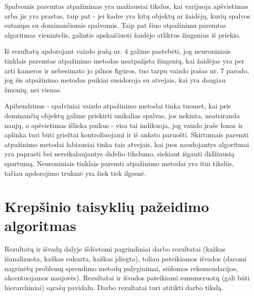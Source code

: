 \documentclass{VUMIFPSbakalaurinis}
\begin{document}
Spalvomis paremtas atpažinimas yra mažiausiai tikslus, kai varijuoja apšvietimas arba jis yra prastas, taip pat - jei kadre yra kitų objektų ar žaidėjų, kurių spalvos sutampa su dominančiomis spalvomis. Taip pat šiuo atpažinimu paremtas algoritmas vienintelis, galintis apskaičiuoti žaidėjo atliktus žingsnius iš priekio. 

Iš rezultatų apdorojant vaizdo įrašą nr. 4 galime pastebėti, jog neuroniniais tinklais paremtas atpažinimo metodas neatpažįsta žingsnių, kai žaidėjas yra per arti kameros ir nebesimato jo pilnos figūros, tuo tarpu vaizdo įrašas nr. 7 parodo, jog šis atpažinimo metodas puikiai susidoroja su atvejais, kai yra daugiau žmonių, nei vienas. 

Apibendrinus - spalviniai vaizdo atpažinimo metodai tinka tuomet, kai prie dominančių objektų galime priskirti unikalias spalvas, jos nekinta, neatsiranda naujų, o apšvietimas išlieka puikus - visa tai indikuoja, jog vaizdo įraše fonas ir aplinka turi būti griežtai kontroliuojami ir iš anksto paruošti. Skirtumais paremti atpažinimo metodai labiausiai tinka tais atvejais, kai juos naudojantys algoritmai yra paprasti bei nereikalaujantys didelio tikslumo, siekiant išgauti didžiausią spartumą. Neuroniniais tinklais paremti atpažinimo metodai yra itin tikslūs, tačiau apdorojimo trukmė yra šiek tiek ilgesnė.

\section{Krepšinio taisyklių pažeidimo algoritmas}

Rezultatų ir išvadų dalyje išdėstomi pagrindiniai darbo rezultatai (kažkas
išanalizuota, kažkas sukurta, kažkas įdiegta), toliau pateikiamos išvados
(daromi nagrinėtų problemų sprendimo metodų palyginimai, siūlomos
rekomendacijos, akcentuojamos naujovės). Rezultatai ir išvados pateikiami
sunumeruotų (gali būti hierarchiniai) sąrašų pavidalu. Darbo rezultatai turi
atitikti darbo tikslą.

\printbibliography[heading=bibintoc]  %
\end{document}
